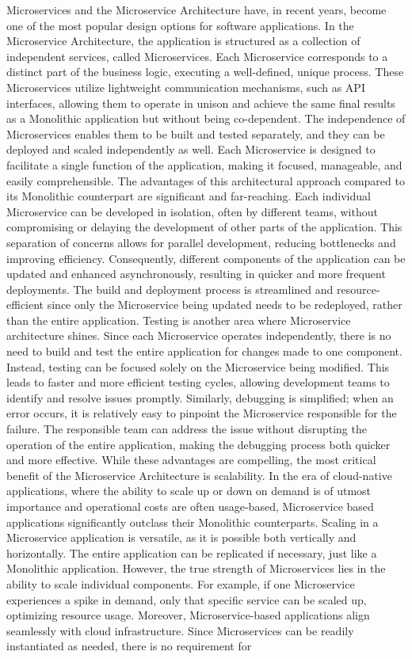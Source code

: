 Microservices and the Microservice Architecture have, in recent years, become one of the most popular design options for software applications. In the Microservice Architecture, the application is structured as a collection of independent services, called Microservices. Each Microservice corresponds to a distinct part of the business logic, executing a well-defined, unique process\cite{monovsmicro}\cite{microservicesdef}. These Microservices utilize lightweight communication mechanisms, such as API interfaces, allowing them to operate in unison and achieve the same final results as a Monolithic application but without being co-dependent. The independence of Microservices enables them to be built and tested separately, and they can be deployed and scaled independently as well. Each Microservice is designed to facilitate a single function of the application, making it focused, manageable, and easily comprehensible\cite{chandrinos_thesis}. The advantages of this architectural approach compared to its Monolithic counterpart are significant and far-reaching. Each individual Microservice can be developed in isolation, often by different teams, without compromising or delaying the development of other parts of the application. This separation of concerns allows for parallel development, reducing bottlenecks and improving efficiency. Consequently, different components of the application can be updated and enhanced asynchronously, resulting in quicker and more frequent deployments. The build and deployment process is streamlined and resource-efficient since only the Microservice being updated needs to be redeployed, rather than the entire application. Testing is another area where Microservice architecture shines. Since each Microservice operates independently, there is no need to build and test the entire application for changes made to one component. Instead, testing can be focused solely on the Microservice being modified. This leads to faster and more efficient testing cycles, allowing development teams to identify and resolve issues promptly. Similarly, debugging is simplified; when an error occurs, it is relatively easy to pinpoint the Microservice responsible for the failure. The responsible team can address the issue without disrupting the operation of the entire application, making the debugging process both quicker and more effective. While these advantages are compelling, the most critical benefit of the Microservice Architecture is scalability. In the era of cloud-native applications, where the ability to scale up or down on demand is of utmost importance and operational costs are often usage-based, Microservice based applications significantly outclass their Monolithic counterparts. Scaling in a Microservice application is versatile, as it is possible both vertically and horizontally. The entire application can be replicated if necessary, just like a Monolithic application. However, the true strength of Microservices lies in the ability to scale individual components. For example, if one Microservice experiences a spike in demand, only that specific service can be scaled up, optimizing resource usage. Moreover, Microservice-based applications align seamlessly with cloud infrastructure. Since Microservices can be readily instantiated as needed, there is no requirement for 